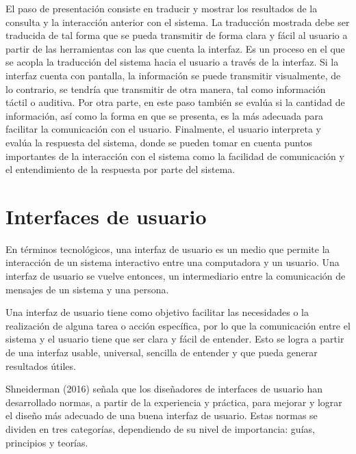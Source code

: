 El paso de presentación consiste en traducir y mostrar los resultados de la consulta y la interacción anterior con el sistema. La traducción mostrada debe ser traducida de tal forma que se pueda transmitir de forma clara y 	fácil al usuario a partir de las herramientas con las que cuenta la interfaz. Es un proceso en el que se acopla la traducción del sistema hacia el usuario a través de la interfaz. Si la interfaz cuenta con pantalla, la información se puede transmitir visualmente, de lo contrario, se tendría que transmitir de otra manera, tal como información táctil o auditiva. Por otra parte, en este paso también se evalúa si la cantidad de información, así como la forma en que se presenta, es la más adecuada para facilitar la comunicación con el usuario. Finalmente, el usuario interpreta y evalúa la respuesta del sistema, donde se pueden tomar en cuenta puntos importantes de la interacción con el sistema como la facilidad de comunicación y el entendimiento de la respuesta por parte del sistema.


\section{Interfaces de usuario}
\label{InterfacesUsuarioCap3}

En términos tecnológicos, una interfaz de usuario es un medio que permite la interacción de un sistema interactivo entre una computadora y un usuario. Una interfaz de usuario se vuelve entonces, un intermediario entre la comunicación de mensajes de un sistema y una persona.

Una interfaz de usuario tiene como objetivo facilitar las necesidades o la realización de alguna tarea o acción específica, por lo que la comunicación entre el sistema y el usuario tiene que ser clara y fácil de entender. Esto se logra a partir de una interfaz usable, universal, sencilla de entender y que pueda generar resultados útiles.

Shneiderman (2016) señala que los diseñadores de interfaces de usuario han desarrollado normas, a partir de la experiencia y práctica, para mejorar y lograr el diseño más adecuado de una buena interfaz de usuario. Estas normas se dividen en tres categorías, dependiendo de su nivel de importancia: guías, principios y teorías.

